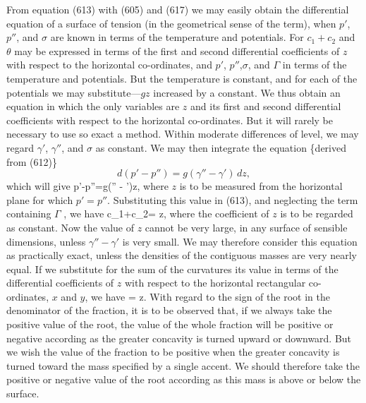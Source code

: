\documentclass[12pt]{article}
\begin{document}
From equation (613) with (605) and (617) we may easily obtain the differential equation of a surface of tension (in the geometrical sense of the term), when $p'$, $p''$, and $\sigma$ are known in terms of the temperature and potentials. For $c_1+c_2$ and $\theta$ may be expressed in terms of the first and second differential coefficients of $z$ with respect to the horizontal co-ordinates, and $p'$, $p''$,$\sigma$, and $\Gamma$ in terms of the temperature and potentials. But the temperature is constant, and for each of the potentials we may substitute---$gz$ increased by a constant. We thus obtain an equation in which the only variables are $z$ and its first and second differential coefficients with respect to the horizontal co-ordinates. But it will rarely be necessary to use so exact a method. Within moderate differences of level, we may regard $\gamma'$, $\gamma''$, and $\sigma$ as constant. We may then integrate the equation \{derived from (612)\}
$$d(p' -p'') = g(\gamma'' - \gamma') \, dz,$$
which will give
\eqs p'-p''=g(\gamma'' - \gamma')z,  \label{618} \eqe
where $z$ is to be measured from the horizontal plane for which $p'=p''$. Substituting this value in (613), and neglecting the term containing  $\Gamma$ , we have
\eqs c_1+c_2=  z,  \label{619} \eqe
where the coefficient of $z$ is to be regarded as constant. Now the value of $z$ cannot be very large, in any surface of sensible dimensions, unless $\gamma'' - \gamma'$ is very small. We may therefore consider this equation as practically exact, unless the densities of the contiguous masses are very nearly equal. If we substitute for the sum of the curvatures its value in terms of the differential coefficients of $z$ with respect to the horizontal rectangular co-ordinates, $x$ and $y$, we have
\eqs 
{} = z.  \label{620} \eqe
With regard to the sign of the root in the denominator of the fraction, it is to be observed that, if we always take the positive value of the root, the value of the whole fraction will be positive or negative according as the greater concavity is turned upward or downward. But we wish the value of the fraction to be positive when the greater concavity is turned toward the mass specified by a single accent. We should therefore take the positive or negative value of the root according as this mass is above or below the surface.
\end{document}
